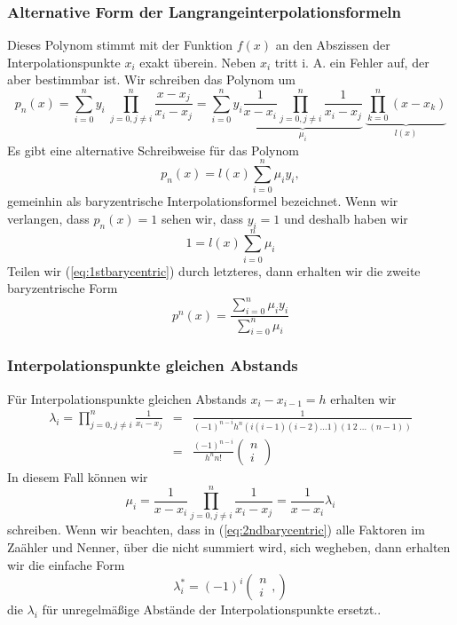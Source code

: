 \subsubsection{Alternative Form  der Langrangeinterpolationsformeln}
Dieses Polynom stimmt mit der Funktion $f(x)$ an den Abszissen der Interpolationspunkte $x_i$ exakt überein. Neben $x_i$ tritt i. A. ein Fehler auf, der aber bestimmbar ist. Wir schreiben das Polynom um
\[ p_n(x)=\sum_{i=0}^n y_i\ \prod_{j=0,j\neq i}^n\frac{x-x_j}{x_i-x_j}=
\sum_{i=0}^n y_i 
\underbrace{
\frac{1}{x-x_i} \prod_{j=0,j\neq i}^n\frac{1}{x_i-x_j} 
}_{\mu_i}\ 
\underbrace{\prod_{k=0}^n (x-x_k)}_{l(x)}
\]
Es gibt eine alternative Schreibweise für das Polynom
\begin{equation}\label{eq:1stbarycentric}
	p_n(x) = l(x)\sum_{i=0}^n \mu_iy_i,
\end{equation}
gemeinhin als baryzentrische Interpolationsformel bezeichnet. Wenn wir verlangen, dass $p_n(x)=1$ sehen wir, dass $y_i=1$ und deshalb haben wir
\[ 1 = l(x)\sum_{i=0}^n \mu_i \]
Teilen wir (\ref{eq:1stbarycentric}) durch letzteres, dann erhalten wir die zweite baryzentrische Form
\begin{equation}
	p^n(x)=\frac{\sum_{i=0}^n \mu_iy_i}{\sum_{i=0}^n \mu_i}
	\label{eq:2ndbarycentric}
\end{equation}
\subsubsection{Interpolationspunkte gleichen Abstands}
Für Interpolationspunkte gleichen Abstands $x_i-x_{i-1}=h$ erhalten wir
\begin{eqnarray*}
\lambda_i =\prod_{j=0,j\neq i}^n\frac{1}{x_i-x_j} 
&=&\frac{1}{(-1)^{n-i}h^n(i(i-1)(i-2)\ldots1)(1\ 2\ \ldots\ (n-1))}\\[1ex]
&=&\frac{(-1)^{n-i}}{h^n n!}
\left(\begin{array}{c}n\\ i\end{array}\right)
\end{eqnarray*}
In diesem Fall können wir  
\[
\mu_i=\frac{1}{x-x_i} \prod_{j=0,j\neq i}^n\frac{1}{x_i-x_j}=
\frac{1}{x-x_i} \lambda_i
\]
schreiben. Wenn wir beachten, dass in (\ref{eq:2ndbarycentric}) alle Faktoren
im Zaähler und Nenner, über die nicht summiert wird, sich wegheben, dann
erhalten wir die einfache Form
\[ 
  \lambda_i^* = (-1)^i\left(\begin{array}{c}n\\ i\end{array},\right)
\]
die $\lambda_i$ für unregelmäßige Abstände der Interpolationspunkte ersetzt..
